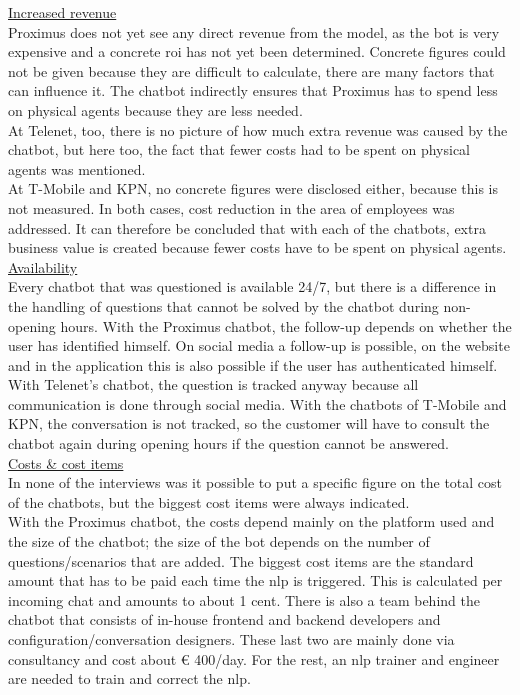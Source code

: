 \ul{Increased revenue}\\
Proximus does not yet see any direct revenue from the model, as the bot is very expensive and a concrete \acrshort{roi} has not yet been determined. Concrete figures could not be given because they are difficult to calculate, there are many factors that can influence it. The chatbot indirectly ensures that Proximus has to spend less on physical agents because they are less needed.\\
\break
At Telenet, too, there is no picture of how much extra revenue was caused by the chatbot, but here too, the fact that fewer costs had to be spent on physical agents was mentioned.\\
\break
At T-Mobile and KPN, no concrete figures were disclosed either, because this is not measured. In both cases, cost reduction in the area of employees was addressed. It can therefore be concluded that with each of the chatbots, extra business value is created because fewer costs have to be spent on physical agents.\\
\break
\ul{Availability}\\
Every chatbot that was questioned is available 24/7, but there is a difference in the handling of questions that cannot be solved by the chatbot during non-opening hours.
With the Proximus chatbot, the follow-up depends on whether the user has identified himself. On social media a follow-up is possible, on the website and in the application this is also possible if the user has authenticated himself. With Telenet's chatbot, the question is tracked anyway because all communication is done through social media. With the chatbots of T-Mobile and KPN, the conversation is not tracked, so the customer will have to consult the chatbot again during opening hours if the question cannot be answered.\\
\break
\ul{Costs \& cost items}\\
In none of the interviews was it possible to put a specific figure on the total cost of the chatbots, but the biggest cost items were always indicated.\\
\break
With the Proximus chatbot, the costs depend mainly on the platform used and the size of the chatbot; the size of the bot depends on the number of questions/scenarios that are added. The biggest cost items are the standard amount that has to be paid each time the \acrshort{nlp} is triggered. This is calculated per incoming chat and amounts to about 1 cent. There is also a team behind the chatbot that consists of in-house frontend and backend developers and configuration/conversation designers. These last two are mainly done via consultancy and cost about € 400/day. For the rest, an \acrshort{nlp} trainer and engineer are needed to train and correct the \acrshort{nlp}.\\  
